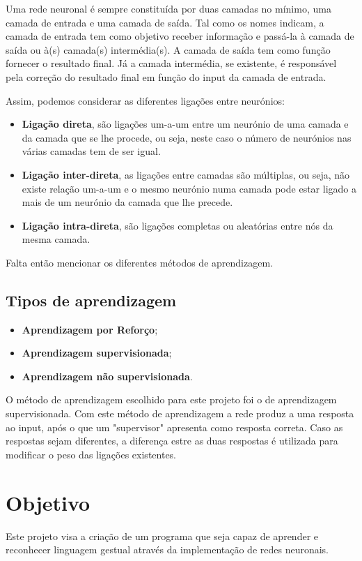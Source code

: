 \documentclass[10pt,a4paper]{article}
\begin{document}
Uma rede neuronal é sempre constituída por duas camadas no mínimo, uma camada de entrada e uma camada de saída. Tal como os nomes indicam, a camada de entrada tem como objetivo receber informação e passá-la à camada de saída ou à(s) camada(s) intermédia(s). A camada de saída tem como função fornecer o resultado final. Já a camada intermédia, se existente, é responsável pela correção do resultado final em função do input da camada de entrada.

Assim, podemos considerar as diferentes ligações entre neurónios:
\begin{itemize}
\item \textbf{Ligação direta}, são ligações um-a-um entre um neurónio de uma camada e da camada que se lhe procede, ou seja, neste caso o número de neurónios nas várias camadas tem de ser igual.
\item \textbf{Ligação inter-direta}, as ligações entre camadas são múltiplas, ou seja, não existe relação um-a-um e o mesmo neurónio numa camada pode estar ligado a mais de um neurónio da camada que lhe precede.
\item \textbf{Ligação intra-direta}, são ligações completas ou aleatórias entre nós da mesma camada.
\end{itemize}

Falta então mencionar os diferentes métodos de aprendizagem.

\subsection{Tipos de aprendizagem}
\begin{itemize}
\item \textbf{Aprendizagem por Reforço};
\item \textbf{Aprendizagem supervisionada};
\item \textbf{Aprendizagem não supervisionada}.
\end{itemize}

O método de aprendizagem escolhido para este projeto foi o de aprendizagem supervisionada. Com este método de aprendizagem a rede produz a uma resposta ao input, após o que um "supervisor" apresenta como resposta correta. Caso as respostas sejam diferentes, a diferença estre as duas respostas é utilizada para modificar o peso das ligações existentes.

\section{Objetivo}
Este projeto visa a criação de um programa que seja capaz de aprender e reconhecer linguagem gestual através da implementação de redes neuronais.
\end{document}
